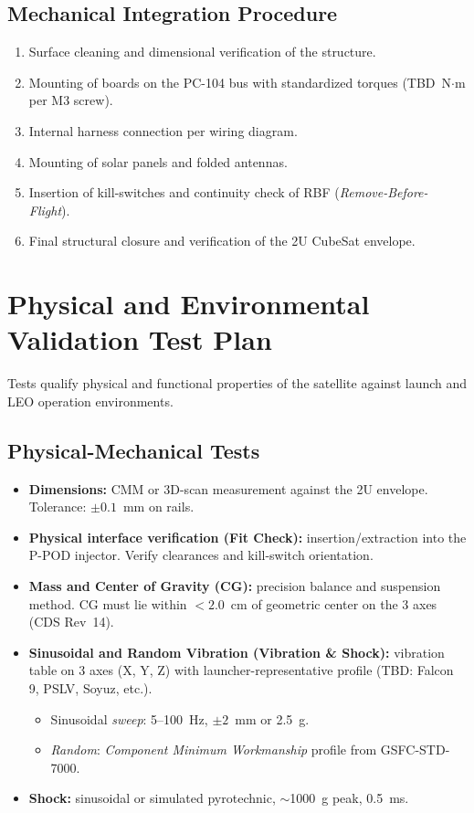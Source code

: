 \subsection{Mechanical Integration Procedure}
\begin{enumerate}
    \item Surface cleaning and dimensional verification of the structure.
    \item Mounting of boards on the PC-104 bus with standardized torques (TBD~N$\cdot$m per M3 screw).
    \item Internal harness connection per wiring diagram.
    \item Mounting of solar panels and folded antennas.
    \item Insertion of kill-switches and continuity check of RBF (\textit{Remove-Before-Flight}).
    \item Final structural closure and verification of the 2U CubeSat envelope.
\end{enumerate}

\section{Physical and Environmental Validation Test Plan}
Tests qualify physical and functional properties of the satellite against launch and LEO operation environments.

\subsection{Physical-Mechanical Tests}
\begin{itemize}
    \item \textbf{Dimensions:} CMM or 3D-scan measurement against the 2U envelope. Tolerance: $\pm 0.1$~mm on rails.

    \item \textbf{Physical interface verification (Fit Check):} insertion/extraction into the P-POD injector. Verify clearances and kill-switch orientation.

    \item \textbf{Mass and Center of Gravity (CG):} precision balance and suspension method. CG must lie within $<2.0$~cm of geometric center on the 3 axes (CDS Rev~14).

    \item \textbf{Sinusoidal and Random Vibration (Vibration \& Shock):} vibration table on 3 axes (X, Y, Z) with launcher-representative profile (TBD: Falcon 9, PSLV, Soyuz, etc.).
    \begin{itemize}
        \item Sinusoidal \textit{sweep}: 5--100~Hz, $\pm 2$~mm or 2.5~g.
        \item \textit{Random}: \textit{Component Minimum Workmanship} profile from GSFC-STD-7000.
    \end{itemize}

    \item \textbf{Shock:} sinusoidal or simulated pyrotechnic, $\sim$1000~g peak, 0.5~ms.
\end{itemize}

